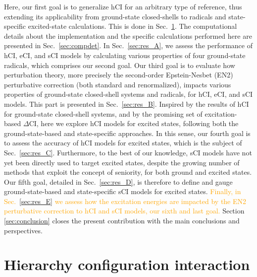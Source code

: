 \documentclass[aip,jcp,reprint,noshowkeys,superscriptaddress]{revtex4-1}
\newcommand{\fk}[1]{\textcolor{orange}{#1}}
\begin{document}
Here, our first goal is to generalize hCI for an arbitrary type of reference, thus extending its applicability from ground-state closed-shells \cite{Kossoski_2022}
to radicals and state-specific excited-state calculations.
This is done in Sec.~\ref{sec:hCI}.
The computational details about the implementation and the specific calculations performed here are presented in Sec.~\ref{sec:compdet}.
In Sec.~\ref{sec:res_A}, we assess the performance of hCI, eCI, and sCI models by calculating various properties of four ground-state radicals, which comprises our second goal.
Our third goal is to evaluate how perturbation theory, more precisely the second-order Epstein-Nesbet (EN2) perturbative correction (both standard and renormalized), \cite{Garniron_2019}
impacts various properties of ground-state closed-shell systems and radicals, for hCI, eCI, and sCI models.
This part is presented in Sec.~\ref{sec:res_B}.
Inspired by the results of hCI for ground-state closed-shell systems, \cite{Kossoski_2022}
and by the promising set of excitation-based $\Delta$CI, \cite{Kossoski_2023} here we explore hCI models for excited states, following both the ground-state-based and state-specific approaches.
In this sense, our fourth goal is to assess the accuracy of hCI models for excited states, which is the subject of Sec.~\ref{sec:res_C}.
Furthermore, to the best of our knowledge, sCI models have not yet been directly used to target excited states,
despite the growing number of methods that exploit the concept of seniority,
for both ground
\cite{Limacher_2013,Limacher_2014,Tecmer_2014,Boguslawski_2014a,Boguslawski_2015,Boguslawski_2014b,Boguslawski_2014c,Johnson_2020,Henderson_2014,Stein_2014,Henderson_2015,Chen_2015,Bytautas_2018,Marie_2021,Boguslawski_2021,Tecmer_2022,Mamache_2023,Fecteau_2022}
and excited states.
\cite{Boguslawski_2016b,Boguslawski_2016c,Boguslawski_2019,Nowak_2019,Kossoski_2021,Marie_2021,Tecmer_2022,Rishi_2023,Nowak_2023,Fecteau_2022}
Our fifth goal, detailed in Sec.~\ref{sec:res_D}, is therefore to define and gauge ground-state-based and state-specific sCI models for excited states.
\fk{Finally, in Sec.~\ref{sec:res_E} we assess how the excitation energies are impacted by the EN2 perturbative correction to hCI and sCI models, our sixth and last goal.}
Section \ref{sec:conclusion} closes the present contribution with the main conclusions and perspectives.

\section{Hierarchy configuration interaction}
\label{sec:hCI}
\end{document}
